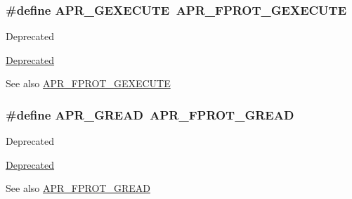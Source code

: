 \subsubsection[{\texorpdfstring{A\+P\+R\+\_\+\+G\+E\+X\+E\+C\+U\+TE}{APR_GEXECUTE}}]{\setlength{\rightskip}{0pt plus 5cm}\#define A\+P\+R\+\_\+\+G\+E\+X\+E\+C\+U\+TE~{\bf A\+P\+R\+\_\+\+F\+P\+R\+O\+T\+\_\+\+G\+E\+X\+E\+C\+U\+TE}}\hypertarget{group__apr__file__permissions_ga79ce615a96a407d6c53325a2f8cdee3d}{}\label{group__apr__file__permissions_ga79ce615a96a407d6c53325a2f8cdee3d}
\begin{DoxyRefDesc}{Deprecated}
\item[\hyperlink{deprecated__deprecated000017}{Deprecated}]\end{DoxyRefDesc}
\begin{DoxySeeAlso}{See also}
\hyperlink{group__apr__file__permissions_gab627bef3f9ceb84bbf00906eaeb12184}{A\+P\+R\+\_\+\+F\+P\+R\+O\+T\+\_\+\+G\+E\+X\+E\+C\+U\+TE} 
\end{DoxySeeAlso}
\subsubsection[{\texorpdfstring{A\+P\+R\+\_\+\+G\+R\+E\+AD}{APR_GREAD}}]{\setlength{\rightskip}{0pt plus 5cm}\#define A\+P\+R\+\_\+\+G\+R\+E\+AD~{\bf A\+P\+R\+\_\+\+F\+P\+R\+O\+T\+\_\+\+G\+R\+E\+AD}}\hypertarget{group__apr__file__permissions_ga1bd0305f31cb3bb20a8f9db898b96eb1}{}\label{group__apr__file__permissions_ga1bd0305f31cb3bb20a8f9db898b96eb1}
\begin{DoxyRefDesc}{Deprecated}
\item[\hyperlink{deprecated__deprecated000015}{Deprecated}]\end{DoxyRefDesc}
\begin{DoxySeeAlso}{See also}
\hyperlink{group__apr__file__permissions_ga5ad9b67b8008db3ffc56c3c2a65aa192}{A\+P\+R\+\_\+\+F\+P\+R\+O\+T\+\_\+\+G\+R\+E\+AD} 
\end{DoxySeeAlso}
